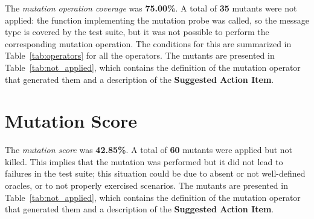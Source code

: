 The \emph{mutation operation coverage} was \textbf{75.00\%}. A total of \textbf{35} mutants were not applied: the function implementing the mutation probe was called, so the message type is covered by the test suite, but it was not possible to perform the corresponding mutation operation.
The conditions for this are summarized in Table~\ref{tab:operators} for all the operators.
The mutants are presented in Table~\ref{tab:not_applied}, which contains the definition of the mutation operator that generated them and a description of the \textbf{Suggested Action Item}.


 


\section{Mutation Score}

 The \emph{mutation score} was \textbf{42.85\%}. A total of \textbf{60} mutants were applied but not killed. This implies that the mutation was performed but it did not lead to failures in the test suite; this situation could be due to absent or not well-defined oracles, or to not properly exercised scenarios.
 The mutants are presented in Table~\ref{tab:not_applied}, which contains the definition of the mutation operator that generated them and a description of the \textbf{Suggested Action Item}.


